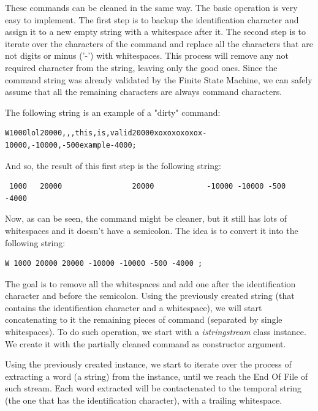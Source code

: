 \documentclass[11pt,twoside,openany,x11names,svgnames]{memoir}
\begin{document}
These commands can be cleaned in the same way. The basic operation is very easy to implement. The first step is to backup the identification character and assign it to a new empty string with a whitespace after it. The second step is to iterate over the characters of the command and replace all the characters that are not digits or minus ('-') with whitespaces. This process will remove any not required character from the string, leaving only the good ones. Since the command string was already validated by the Finite State Machine, we can safely assume that all the remaining characters are always command characters.

The following string is an example of a "dirty" command:

\begin{verbatim}
W1000lol20000,,,this,is,valid20000xoxoxoxoxox-10000,-10000,-500example-4000;
\end{verbatim}

And so, the result of this first step is the following string:

\begin{verbatim}
 1000   20000                20000            -10000 -10000 -500       -4000
\end{verbatim}

Now, as can be seen, the command might be cleaner, but it still has lots of whitespaces and it doesn't have a semicolon. The idea is to convert it into the following string:

\begin{verbatim}
W 1000 20000 20000 -10000 -10000 -500 -4000 ;
\end{verbatim}

The goal is to remove all the whitespaces and add one after the identification character and before the semicolon. Using the previously created string (that contains the identification character and a whitespace), we will start concatenating to it the remaining pieces of command (separated by single whitespaces). To do such operation, we start with a \textit{istringstream} class instance. We create it with the partially cleaned command as constructor argument.

Using the previously created instance, we start to iterate over the process of extracting a word (a string) from the instance, until we reach the End Of File of such stream. Each word extracted will be contactenated to the temporal string (the one that has the identification character), with a trailing whitespace.
\end{document}
